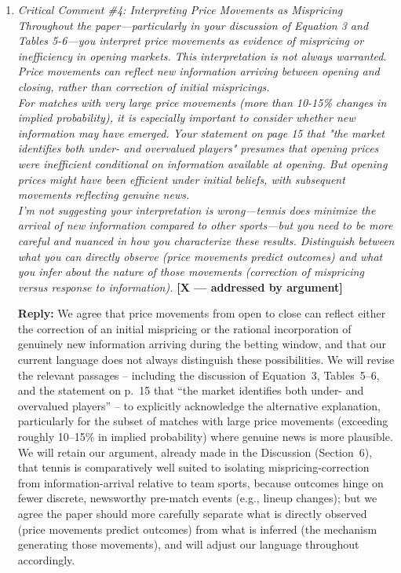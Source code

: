 \documentclass[letterpaper,12pt]{article}
\newcounter{b}
\newcommand{\argX}{\textcolor{green!55!black}{\textbf{[X --- addressed by argument]}}}
\newcommand{\Reply}[1]{\par\noindent\textbf{Reply:} #1}
\begin{document}
\begin{enumerate}
\item \textit{Critical Comment \#4: Interpreting Price Movements as Mispricing\\[6pt]
Throughout the paper—particularly in your discussion of Equation 3 and Tables 5-6—you interpret price movements as evidence of mispricing or inefficiency in opening markets. This interpretation is not always warranted. Price movements can reflect new information arriving between opening and closing, rather than correction of initial mispricings.\\[6pt]
For matches with very large price movements (more than 10-15\% changes in implied probability), it is especially important to consider whether new information may have emerged. Your statement on page 15 that "the market identifies both under- and overvalued players" presumes that opening prices were inefficient conditional on information available at opening. But opening prices might have been efficient under initial beliefs, with subsequent movements reflecting genuine news.\\[6pt]
I'm not suggesting your interpretation is wrong—tennis does minimize the arrival of new information compared to other sports—but you need to be more careful and nuanced in how you characterize these results. Distinguish between what you can directly observe (price movements predict outcomes) and what you infer about the nature of those movements (correction of mispricing versus response to information).} \argX

\Reply{We agree that price movements from open to close can reflect either the correction of an initial mispricing or the rational incorporation of genuinely new information arriving during the betting window, and that our current language does not always distinguish these possibilities. We will revise the relevant passages -- including the discussion of Equation~3, Tables~5--6, and the statement on p.~15 that ``the market identifies both under- and overvalued players'' -- to explicitly acknowledge the alternative explanation, particularly for the subset of matches with large price movements (exceeding roughly 10--15\% in implied probability) where genuine news is more plausible. We will retain our argument, already made in the Discussion (Section~6), that tennis is comparatively well suited to isolating mispricing-correction from information-arrival relative to team sports, because outcomes hinge on fewer discrete, newsworthy pre-match events (e.g., lineup changes); but we agree the paper should more carefully separate what is directly observed (price movements predict outcomes) from what is inferred (the mechanism generating those movements), and will adjust our language throughout accordingly.}


\end{enumerate}
\end{document}

